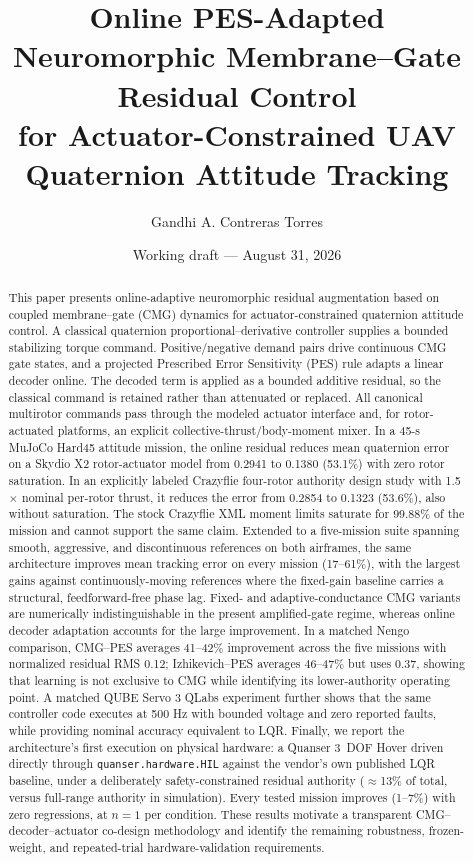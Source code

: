 \documentclass[10pt,twocolumn]{article}
\title{\textbf{Online PES-Adapted Neuromorphic Membrane--Gate Residual Control\\
for Actuator-Constrained UAV Quaternion Attitude Tracking}}
\author{Gandhi A. Contreras Torres}
\date{Working draft --- August 31, 2026}
\begin{document}
\maketitle

\begin{abstract}
This paper presents online-adaptive neuromorphic residual augmentation based on
coupled membrane--gate (CMG) dynamics for actuator-constrained quaternion
attitude control. A classical quaternion proportional--derivative controller
supplies a bounded stabilizing torque command. Positive/negative demand pairs
drive continuous CMG gate states, and a projected Prescribed Error Sensitivity
(PES) rule adapts a linear decoder online. The decoded term is applied as a
bounded additive residual, so the classical command is retained rather than
attenuated or replaced. All canonical multirotor commands pass through the
modeled actuator interface and, for rotor-actuated platforms, an explicit
collective-thrust/body-moment mixer. In a 45-s MuJoCo Hard45 attitude
mission, the online residual reduces mean quaternion error on a Skydio X2
rotor-actuator model from 0.2941 to 0.1380 (53.1\%) with zero rotor
saturation. In an explicitly labeled Crazyflie four-rotor authority design
study with 1.5$\times$ nominal per-rotor thrust, it reduces the error from
0.2854 to 0.1323 (53.6\%), also without saturation. The stock Crazyflie XML
moment limits saturate for 99.88\% of the mission and cannot support the
same claim. Extended to a five-mission suite spanning smooth, aggressive,
and discontinuous references on both airframes, the same architecture
improves mean tracking error on every mission (17--61\%), with the largest
gains against continuously-moving references where the fixed-gain baseline
carries a structural, feedforward-free phase lag. Fixed- and
adaptive-conductance CMG variants are numerically indistinguishable in the
present amplified-gate regime, whereas online decoder adaptation accounts
for the large improvement. In a matched Nengo comparison, CMG--PES averages
41--42\% improvement across the five missions with normalized residual RMS
0.12; Izhikevich--PES averages 46--47\% but uses 0.37, showing that learning is
not exclusive to CMG while identifying its lower-authority operating point.
A matched QUBE Servo 3 QLabs experiment further
shows that the same controller code executes at 500 Hz with bounded voltage
and zero reported faults, while providing nominal accuracy equivalent to
LQR. Finally, we report the architecture's first execution on physical
hardware: a Quanser 3~DOF Hover driven directly through
\texttt{quanser.hardware.HIL} against the vendor's own published LQR
baseline, under a deliberately safety-constrained residual authority
($\approx$13\% of total, versus full-range authority in simulation). Every
tested mission improves (1--7\%) with zero regressions, at $n=1$ per
condition. These results motivate a transparent CMG--decoder--actuator
co-design methodology and identify the remaining robustness, frozen-weight,
and repeated-trial hardware-validation requirements.
\end{abstract}
\end{document}
